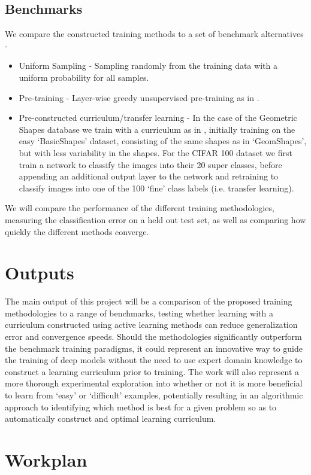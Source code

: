 \documentclass[a4paper,10pt]{article}
\begin{document}
\subsection*{Benchmarks}
We compare the constructed training methods to a set of benchmark alternatives -
\begin{itemize}
	\item Uniform Sampling - Sampling randomly from the training data with a uniform probability for all samples.
	\item Pre-training - Layer-wise greedy unsupervised pre-training as in \cite{Erhan 09}.
	\item Pre-constructed curriculum/transfer learning - In the case of the Geometric Shapes database we train with a curriculum as in \cite{Bengio 09}, initially training on the easy `BasicShapes' dataset, consisting of the same shapes as in `GeomShapes', but with less variability in the shapes. For the CIFAR 100 dataset we first train a network to classify the images into their 20 super classes, before appending an additional output layer to the network and retraining to classify images into one of the 100 `fine' class labels (i.e. transfer learning). 
\end{itemize}
We will compare the performance of the different training methodologies, measuring the classification error on a held out test set, as well as comparing how quickly the different methods converge.

\section{Outputs}
The main output of this project will be a comparison of the proposed training methodologies to a range of benchmarks, testing whether learning with a curriculum constructed using active learning methods can reduce generalization error and convergence speeds. Should the methodologies significantly outperform the benchmark training paradigms, it could represent an innovative way to guide the training of deep models without the need to use expert domain knowledge to construct a learning curriculum prior to training. The work will also represent a more thorough experimental exploration into whether or not it is more beneficial to learn from `easy' or `difficult' examples, potentially resulting in an algorithmic approach to identifying which method is best for a given problem so as to automatically construct and optimal learning curriculum.

\section{Workplan}
\end{document}
